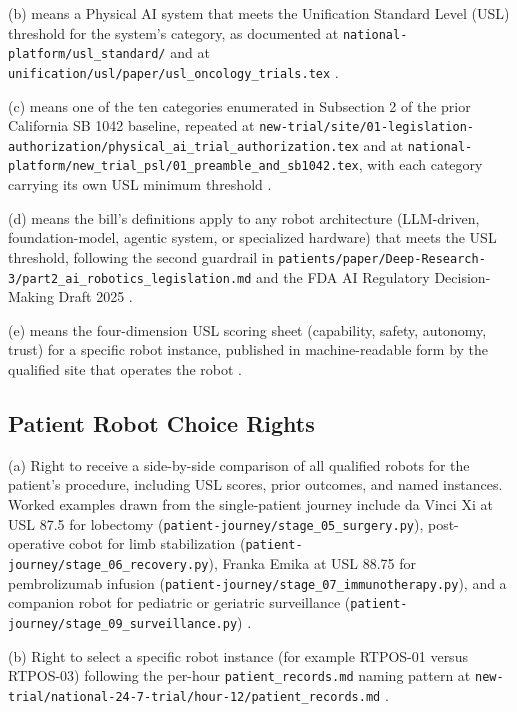 (b)  means a Physical AI system that meets
the Unification Standard Level (USL) threshold for the system's
category, as documented at \texttt{national-platform/usl\_standard/}
and at \texttt{unification/usl/paper/usl\_oncology\_trials.tex}
\cite{kawchak_2026_18778219}.

(c)  means one of the ten categories
enumerated in Subsection 2 of the prior California SB 1042 baseline,
repeated at
\texttt{new-trial/site/01-legislation-authorization/physical\_ai\_trial\_authorization.tex}
and at
\texttt{national-platform/new\_trial\_psl/01\_preamble\_and\_sb1042.tex},
with each category carrying its own USL minimum threshold
\cite{kawchak_2026_19176370}.

(d)  means the bill's definitions apply
to any robot architecture (LLM-driven, foundation-model, agentic
system, or specialized hardware) that meets the USL threshold,
following the second guardrail in
\texttt{patients/paper/Deep-Research-3/part2\_ai\_robotics\_legislation.md}
and the FDA AI Regulatory Decision-Making Draft 2025
\cite{fda_ai_regulatory_decision_draft_2025}.

(e)  means the four-dimension USL
scoring sheet (capability, safety, autonomy, trust) for a specific
robot instance, published in machine-readable form by the qualified
site that operates the robot \cite{kawchak_2026_18778219}.

\subsection{Patient Robot Choice Rights}

(a) Right to receive a side-by-side comparison of all qualified
robots for the patient's procedure, including USL scores, prior
outcomes, and named instances. Worked examples drawn from the
single-patient journey include da Vinci Xi at USL 87.5 for lobectomy
(\texttt{patient-journey/stage\_05\_surgery.py}), post-operative
cobot for limb stabilization
(\texttt{patient-journey/stage\_06\_recovery.py}), Franka Emika at
USL 88.75 for pembrolizumab infusion
(\texttt{patient-journey/stage\_07\_immunotherapy.py}), and a
companion robot for pediatric or geriatric surveillance
(\texttt{patient-journey/stage\_09\_surveillance.py})
\cite{kawchak_2026_19119939}.

(b) Right to select a specific robot instance (for example RTPOS-01
versus RTPOS-03) following the per-hour
\texttt{patient\_records.md} naming pattern at
\texttt{new-trial/national-24-7-trial/hour-12/patient\_records.md}
\cite{kawchak_2026_19994945}.

